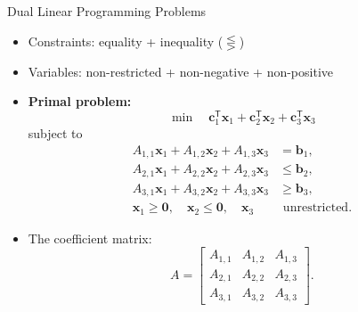 \documentclass[aspectratio=169,hyperref,UTF8,CJK]{beamer}
\newcommand{\trans}{\mathsf{T}}
\newcommand{\vect}[1]{\boldsymbol{#1}}
\begin{document}
\begin{frame}{Dual Linear Programming Problems}
  \small
  \begin{itemize}
    \item Constraints: equality + inequality ($\lesseqgtr$)
    \item Variables: non-restricted + non-negative + non-positive
    \item \textbf{Primal problem:}
      \begin{equation*}
        \min\quad \vect{c}_1^{\trans}\vect{x}_1+
        \vect{c}_2^{\trans}\vect{x}_2+
        \vect{c}_3^{\trans}\vect{x}_3
      \end{equation*}
      subject to
      \begin{align*}
        A_{1,1}\vect{x}_1+A_{1,2}\vect{x}_2+A_{1,3}\vect{x}_3&=\vect{b}_1,\\
        A_{2,1}\vect{x}_1+A_{2,2}\vect{x}_2+A_{2,3}\vect{x}_3&\le\vect{b}_2,\\
        A_{3,1}\vect{x}_1+A_{3,2}\vect{x}_2+A_{3,3}\vect{x}_3&\ge\vect{b}_3,\\
        \vect{x}_1\ge\vect{0},\quad \vect{x}_2\le\vect{0},\quad
        \vect{x}_3&\text{ unrestricted.}
      \end{align*}
    \item The coefficient matrix:
      \begin{equation*}
        A=\begin{bmatrix}A_{1,1}&A_{1,2}&A_{1,3}\\A_{2,1}&A_{2,2}&A_{2,3}\\A_{3,1}&A_{3,2}&A_{3,3}\end{bmatrix}.
      \end{equation*}
  \end{itemize}
\end{frame}
\end{document}
